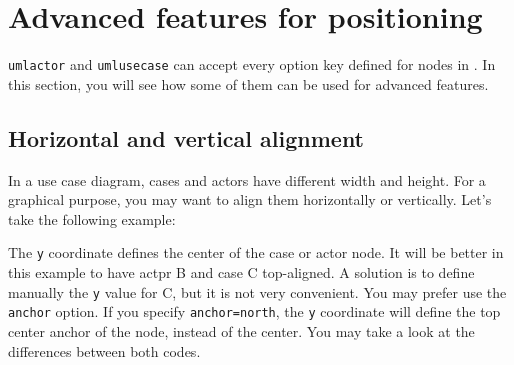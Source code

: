 \documentclass[a4paper,11pt]{report}
\begin{document}
\begin{minipage}{0.51\textwidth}
	
\end{minipage}
\begin{minipage}{0.49\textwidth}
	\begin{center}
	\end{center}
\end{minipage}

\medskip\section{Advanced features for positioning}\label{s.ucdiagadvfeat}

{\tt umlactor} and {\tt umlusecase} can accept every option key defined for nodes in \TikZ.
In this section, you will see how some of them can be used for advanced features.

\subsection{Horizontal and vertical alignment}\label{ss.ucdiaghvalign}

In a use case diagram, cases and actors have different width and height. For a graphical purpose, you may want to align them horizontally or vertically. Let's take the following example:

\medskip

\begin{minipage}{0.5\textwidth}
	
\end{minipage}
\begin{minipage}{0.5\textwidth}
	\begin{center}
	\end{center}
\end{minipage}

\medskip

The {\tt y} coordinate defines the center of the case or actor node. It will be better in this example to have actpr B and case C top-aligned. A solution is to define manually the {\tt y} value for C, but it is not very convenient. You may prefer use the {\tt anchor} option. If you specify {\tt anchor=north}, the {\tt y} coordinate will define the top center anchor of the node, instead of the center. You may take a look at the differences between both codes.

\medskip
\end{document}
